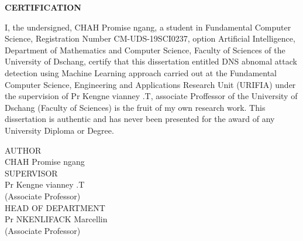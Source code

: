 
        \begin{center}
            \textbf{CERTIFICATION }\\
        \end{center} 
                                            
                                            \vspace{1cm}   
I, the undersigned, CHAH Promise ngang, a student in Fundamental Computer Science, Registration Number CM-UDS-19SCI0237, option Artificial Intelligence, Department of Mathematics and Computer Science, Faculty of Sciences 
of the University of Dschang, certify that this dissertation entitled DNS abnomal attack detection using Machine Learning approach carried out at the Fundamental Computer Science, Engineering and Applications Research Unit (URIFIA) under the supervision of Pr Kengne vianney .T, associate Proffessor of the University of Dschang (Faculty of Sciences) is the fruit of my own research work. 
This dissertation is authentic and has never been presented for the award of any University Diploma or Degree.
\begin{center}
    

                        AUTHOR\\
                        \vspace{1cm}
                   CHAH Promise ngang\\
                                          \vspace{1cm}
                         SUPERVISOR\\
                                                \vspace{1cm}
                    Pr Kengne vianney .T\\

                            (Associate Professor) \\
                                            
                        HEAD OF DEPARTMENT\\
                                              \vspace{1cm} 
                    Pr NKENLIFACK Marcellin \\
                                           \vspace{1cm}
                                (Associate Professor)

\end{center}